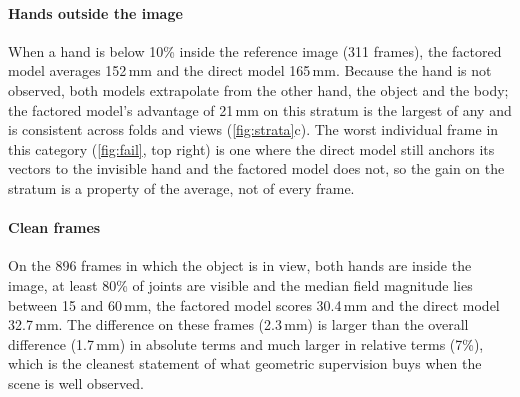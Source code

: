 \paragraph{Hands outside the image}
When a hand is below 10\% inside the reference image (311 frames), the factored model averages 152\,mm and the direct model 165\,mm. Because the hand is not observed, both models extrapolate from the other hand, the object and the body; the factored model's advantage of 21\,mm on this stratum is the largest of any and is consistent across folds and views (\cref{fig:strata}c). The worst individual frame in this category (\cref{fig:fail}, top right) is one where the direct model still anchors its vectors to the invisible hand and the factored model does not, so the gain on the stratum is a property of the average, not of every frame.

\paragraph{Clean frames}
On the 896 frames in which the object is in view, both hands are inside the image, at least 80\% of joints are visible and the median field magnitude lies between 15 and 60\,mm, the factored model scores 30.4\,mm and the direct model 32.7\,mm. The difference on these frames (2.3\,mm) is larger than the overall difference (1.7\,mm) in absolute terms and much larger in relative terms (7\%), which is the cleanest statement of what geometric supervision buys when the scene is well observed.
